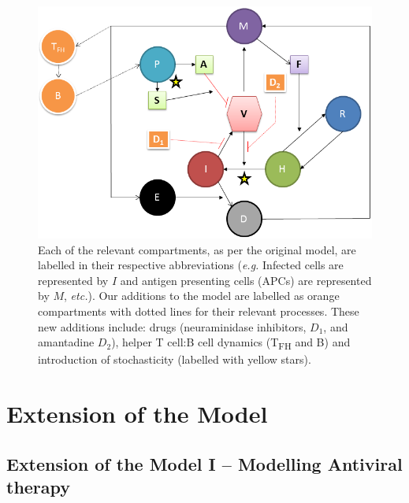 \documentclass[a4paper, 12pt]{report}
\begin{document}
\begin{figure}[htb]
\label{newmodel}
\includegraphics[width = 150mm]{Diagram.png}
\caption{Each of the relevant compartments, as per the original model, are labelled in their respective abbreviations (\emph{e.g.} Infected cells are represented by $I$ and antigen presenting cells (APCs) are represented by $M$, \emph{etc.}). Our additions to the model are labelled as orange compartments with dotted lines for their relevant processes. These new additions include: drugs (neuraminidase inhibitors, $D_1$, and amantadine $D_2$), helper T cell:B cell dynamics (T\textsubscript{FH} and B) and introduction of stochasticity (labelled with yellow stars).}
\end{figure}

\chapter{Extension of the Model}
\section{Extension of the Model I -- Modelling Antiviral therapy}
\end{document}
